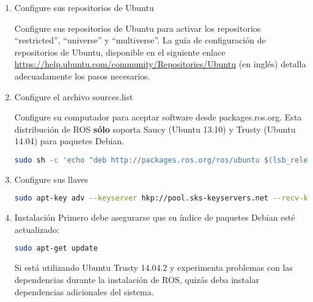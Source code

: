 \begin{enumerate}
\renewcommand{\labelenumii}{\theenumii}
\renewcommand{\theenumii}{\theenumi.\arabic{enumii}.}
	\item Configure sus repositorios de Ubuntu

	Configure sus repositorios de Ubuntu para activar los repositorios ``restricted'', ``universe'' y ``multiverse''. La guía de configuración de repositorios de Ubuntu, disponible en el siguiente enlace \url{https://help.ubuntu.com/community/Repositories/Ubuntu} (en inglés) detalla adecuadamente los pasos necesarios.
	\item Configure el archivo sources.list

	Configure su computador para aceptar software desde packages.ros.org. Esta distribución de ROS \textbf{sólo} soporta Saucy (Ubuntu 13.10) y Trusty (Ubuntu 14.04) para paquetes Debian.

	\begin{blackcodebox}
	\begin{lstlisting}[language=bash]
sudo sh -c 'echo "deb http://packages.ros.org/ros/ubuntu $(lsb_release -sc) main" > /etc/apt/sources.list.d/ros-latest.list'
	\end{lstlisting}
	\end{blackcodebox}

	\item Configure sus llaves


	\begin{blackcodebox}
	\begin{lstlisting}[language=bash]
sudo apt-key adv --keyserver hkp://pool.sks-keyservers.net --recv-key\\ 0xB01FA116
	\end{lstlisting}
	\end{blackcodebox}

	\item Instalación
	Primero debe asegurarse que su índice de paquetes Debian esté actualizado:

	\begin{blackcodebox}
	\begin{lstlisting}[language=bash]
sudo apt-get update
	\end{lstlisting}
	\end{blackcodebox}

	Si está utilizando Ubuntu Trusty 14.04.2 y experimenta problemas con las dependencias durante la instalación de ROS, quizás deba instalar dependencias adicionales del sistema.


\end{enumerate}
